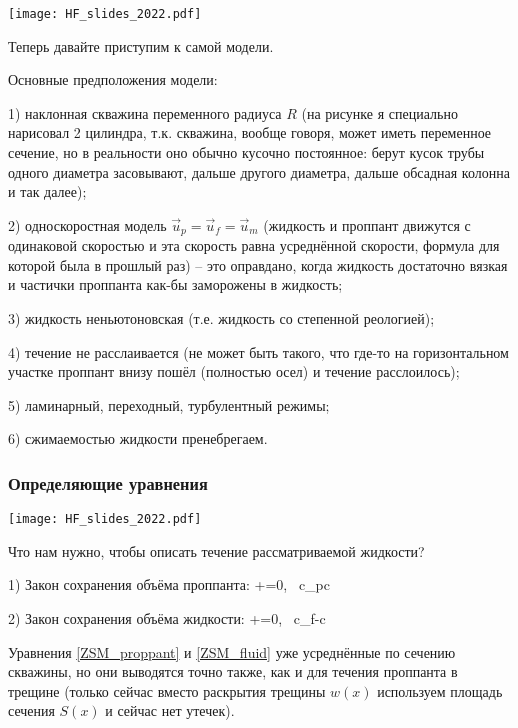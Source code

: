 \documentclass[main.tex]{subfiles}
\begin{document}
\texttt{[image: HF\_slides\_2022.pdf]}

Теперь давайте приступим к самой модели.

Основные предположения модели:

1) наклонная скважина переменного радиуса $R$ (на рисунке я специально нарисовал 2 цилиндра, т.к. скважина, вообще говоря, может иметь переменное сечение, но в реальности оно обычно кусочно постоянное: берут кусок трубы одного диаметра засовывают, дальше другого диаметра, дальше обсадная колонна и так далее);

2) односкоростная модель $\vec{u}_p=\vec{u}_f=\vec{u}_m$ (жидкость и проппант движутся с одинаковой скоростью и эта скорость равна усреднённой скорости, формула для которой была в прошлый раз) -- это оправдано, когда жидкость достаточно вязкая и частички проппанта как-бы заморожены в жидкость;

3) жидкость неньютоновская (т.е. жидкость со степенной реологией);

4) течение не расслаивается (не может быть такого, что где-то на горизонтальном участке проппант внизу пошёл (полностью осел) и течение расслоилось);

5) ламинарный, переходный, турбулентный режимы;

6) сжимаемостью жидкости пренебрегаем.
\\

\subsubsection{Определяющие уравнения}

\texttt{[image: HF\_slides\_2022.pdf]}

Что нам нужно, чтобы описать течение рассматриваемой жидкости?

1) Закон сохранения объёма проппанта:
\beq\label{ZSM_proppant}
+=0,\,\,\,\,\,c_p\equiv c
\eeq

2) Закон сохранения объёма жидкости:
\beq\label{ZSM_fluid}
+=0,\,\,\,\,\,c_f-c
\eeq

Уравнения \eqref{ZSM_proppant} и \eqref{ZSM_fluid} уже усреднённые по сечению скважины, но они выводятся точно также, как и для течения проппанта в трещине (только сейчас вместо раскрытия трещины $w(x)$ используем площадь сечения $S(x)$ и сейчас нет утечек).
\end{document}
